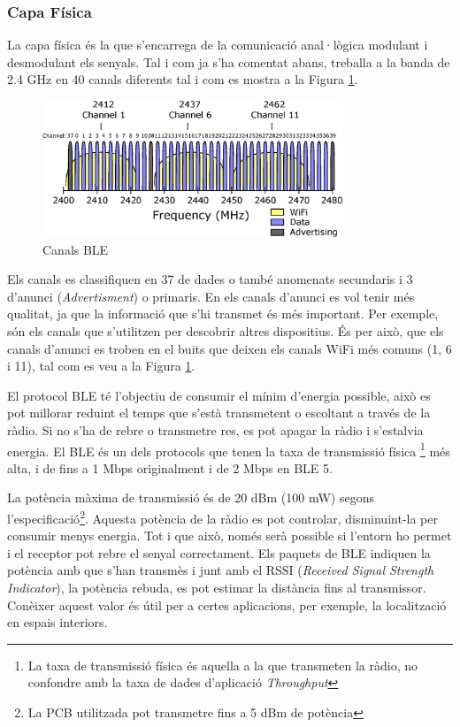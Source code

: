 \subsubsection{Capa Física}
La capa física és la que s'encarrega de la comunicació anal·lògica modulant i desmodulant els senyals.
Tal i com ja s'ha comentat abans, treballa a la banda de 2.4 GHz en 40 canals diferents tal i com es mostra a la Figura \ref{BLE_Channels}.

\begin{figure}[hb]
	\begin{center}
		\includegraphics[width=0.8\textwidth]{./diagrames/BLE_WiFi}
		\caption{Canals BLE \cite{ble_feq}}
		\label{BLE_Channels}
	\end{center}
\end{figure}

Els canals es classifiquen en 37 de dades o també anomenats secundaris i 3 d'anunci (\textit{Advertisment}) o primaris.
En els canals d'anunci es vol tenir més qualitat, ja que la informació que s'hi transmet és més important.
Per exemple, són els canals que s'utilitzen per descobrir altres dispositius.
És per això, que els canals d'anunci es troben en el buits que deixen els canals WiFi més comuns (1, 6 i 11), tal com es veu a la Figura \ref{BLE_Channels}.

El protocol BLE té l'objectiu de consumir el mínim d'energia possible, això es pot millorar reduint el temps que s'està transmetent o escoltant a través de la ràdio.
Si no s'ha de rebre o transmetre res, es pot apagar la ràdio i s'estalvia energia.
El BLE és un dels protocols que tenen la taxa de transmissió física \footnote{La taxa de transmissió física és aquella a la que transmeten la ràdio, no confondre amb la taxa de dades d'aplicació \textit{Throughput}} més alta, i de fins a 1 Mbps originalment i de 2 Mbps en BLE 5.

La potència màxima de transmissió és de 20 dBm (100 mW) segons l'especificació\footnote{La PCB utilitzada pot transmetre fins a 5 dBm de potència}.
Aquesta potència de la ràdio es pot controlar, disminuint-la per consumir menys energia.
Tot i que això, només serà possible si l'entorn ho permet i el receptor pot rebre el senyal correctament.
Els paquets de BLE indiquen la potència amb que s'han transmès i junt amb el RSSI (\textit{Received Signal Strength Indicator}), la potència rebuda, es pot estimar la distància fins al transmissor.
Conèixer aquest valor és útil per a certes aplicacions, per exemple, la localització en espais interiors.

